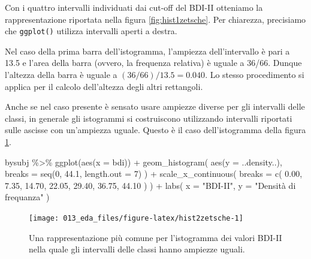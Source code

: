 \documentclass[
  10pt,
  italian,
  a4paper,
  extrafontsizes,onecolumn,openright
  ]{memoir}
\newenvironment{Shaded}{\begin{snugshade}}{\end{snugshade}}
\newcommand{\AttributeTok}[1]{\textcolor[rgb]{0.77,0.63,0.00}{#1}}
\newcommand{\DecValTok}[1]{\textcolor[rgb]{0.00,0.00,0.81}{#1}}
\newcommand{\FloatTok}[1]{\textcolor[rgb]{0.00,0.00,0.81}{#1}}
\newcommand{\FunctionTok}[1]{\textcolor[rgb]{0.00,0.00,0.00}{#1}}
\newcommand{\NormalTok}[1]{#1}
\newcommand{\SpecialCharTok}[1]{\textcolor[rgb]{0.00,0.00,0.00}{#1}}
\newcommand{\StringTok}[1]{\textcolor[rgb]{0.31,0.60,0.02}{#1}}
\theoremstyle{definition}
\theoremstyle{definition}
\theoremstyle{definition}
\theoremstyle{definition}
\theoremstyle{remark}
\begin{document}
Con i quattro intervalli individuati dai cut-off del BDI-II otteniamo la
rappresentazione riportata nella figura \ref{fig:hist1zetsche}. Per chiarezza, precisiamo che \texttt{ggplot()} utilizza intervalli aperti a destra.

Nel caso della prima barra dell'istogramma, l'ampiezza dell'intervallo è pari a 13.5 e l'area della barra (ovvero, la frequenza relativa) è uguale a 36/66. Dunque l'altezza della barra è uguale a \((36 / 66) / 13.5 = 0.040\). Lo stesso procedimento si applica per il calcolo dell'altezza degli altri rettangoli.

Anche se nel caso presente è sensato usare ampiezze diverse per gli intervalli delle classi, in generale gli istogrammi si costruiscono utilizzando intervalli riportati sulle ascisse con un'ampiezza uguale. Questo è il caso dell'istogramma della figura \ref{fig:hist2zetsche}.

\begin{Shaded}
\begin{Highlighting}[]
\NormalTok{bysubj }\SpecialCharTok{\%\textgreater{}\%}
  \FunctionTok{ggplot}\NormalTok{(}\FunctionTok{aes}\NormalTok{(}\AttributeTok{x =}\NormalTok{ bdi)) }\SpecialCharTok{+}
  \FunctionTok{geom\_histogram}\NormalTok{(}
    \FunctionTok{aes}\NormalTok{(}\AttributeTok{y =}\NormalTok{ ..density..),}
    \AttributeTok{breaks =} \FunctionTok{seq}\NormalTok{(}\DecValTok{0}\NormalTok{, }\FloatTok{44.1}\NormalTok{, }\AttributeTok{length.out =} \DecValTok{7}\NormalTok{)}
\NormalTok{  ) }\SpecialCharTok{+}
  \FunctionTok{scale\_x\_continuous}\NormalTok{(}
    \AttributeTok{breaks =} \FunctionTok{c}\NormalTok{(}
      \FloatTok{0.00}\NormalTok{, }\FloatTok{7.35}\NormalTok{, }\FloatTok{14.70}\NormalTok{, }\FloatTok{22.05}\NormalTok{,}
      \FloatTok{29.40}\NormalTok{, }\FloatTok{36.75}\NormalTok{, }\FloatTok{44.10}
\NormalTok{    )}
\NormalTok{  ) }\SpecialCharTok{+}
  \FunctionTok{labs}\NormalTok{(}
    \AttributeTok{x =} \StringTok{"BDI{-}II"}\NormalTok{,}
    \AttributeTok{y =} \StringTok{"Densità di frequanza"}
\NormalTok{  )}
\end{Highlighting}
\end{Shaded}

\begin{figure}[h]

{\centering \texttt{[image: 013\_eda\_files/figure-latex/hist2zetsche-1]} 

}

\caption{Una rappresentazione più comune per l'istogramma dei valori BDI-II nella quale gli intervalli delle classi hanno ampiezze uguali.}\label{fig:hist2zetsche}
\end{figure}
\end{document}
